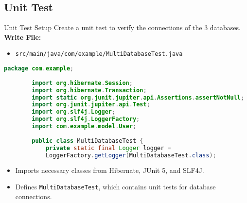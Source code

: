 \documentclass[aspectratio=169, table]{beamer}
\begin{document}
\subsection{Unit Test}

\begin{frame}[fragile]{Unit Test Setup}
	\vspace{20pt}
	Create a unit test to verify the connections of the 3 databases. \textbf{Write File:}  
	\begin{itemize}
		\item \texttt{src/main/java/com/example/MultiDatabaseTest.java}
	\end{itemize}
	
	\begin{lstlisting}[language=Java, style=JavaStyle]
		package com.example;
		
		import org.hibernate.Session;
		import org.hibernate.Transaction;
		import static org.junit.jupiter.api.Assertions.assertNotNull;
		import org.junit.jupiter.api.Test;
		import org.slf4j.Logger;
		import org.slf4j.LoggerFactory;
		import com.example.model.User;
		
		public class MultiDatabaseTest {
			private static final Logger logger = 
			LoggerFactory.getLogger(MultiDatabaseTest.class);
		\end{lstlisting}
		
		\begin{itemize}
			\item Imports necessary classes from Hibernate, JUnit 5, and SLF4J.
			\item Defines \texttt{MultiDatabaseTest}, which contains unit tests for database connections.
		\end{itemize}
	\end{frame}
	
\end{document}
